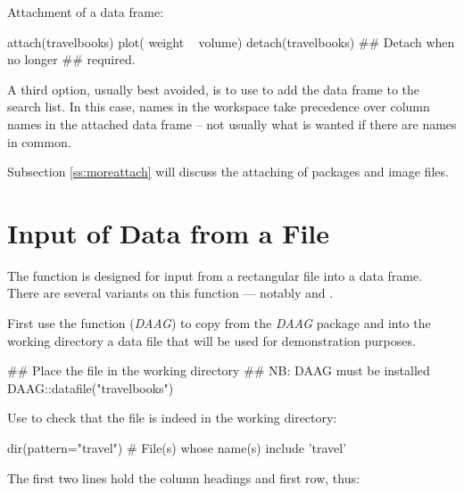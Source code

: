 \begin{marginfigure}[84pt]
Attachment of a data frame:
\begin{Schunk}
\begin{Sinput}
attach(travelbooks)
plot( weight ~ volume)
detach(travelbooks)
 ## Detach when no longer
 ## required.
\end{Sinput}
\end{Schunk}
\end{marginfigure}
A third option, usually best avoided,
is to use  to add the data frame to the search list. In
this case, names in the workspace take precedence over column names in
the attached data frame -- not usually what is wanted if there are
names in common.

Subsection \ref{ss:moreattach} will discuss the attaching of packages
and image files.

\section{Input of Data from a File}\label{sec:input}

The function  is designed for input from a
rectangular file into a data frame. There are several variants on this
function --- notably  and .

  First use the function 
(\textit{DAAG}) to copy from the {\em DAAG} package and into the
working directory a data file that will be used for demonstration purposes.

\begin{Schunk}
\begin{Sinput}
## Place the file in the working directory
## NB: DAAG must be installed
DAAG::datafile("travelbooks")
\end{Sinput}
\end{Schunk}
\noindent
Use  to check that the file is indeed in the working directory:
\begin{Schunk}
\begin{Sinput}
dir(pattern="travel")
  # File(s) whose name(s) include 'travel'
\end{Sinput}
\end{Schunk}

The first two lines hold the column headings and first row, thus:\vspace*{9pt}

